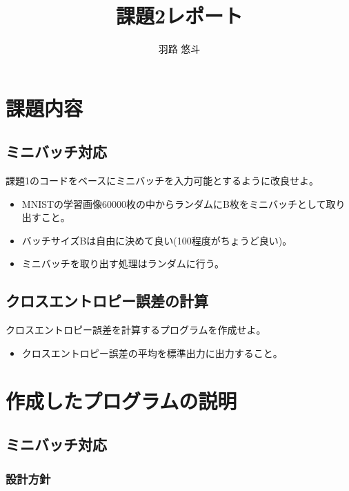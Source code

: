 \documentclass[platex,dvipdfmx]{jsarticle}
\begin{document}
  \title{課題2レポート}
  \author{羽路 悠斗}
  \maketitle

  \section{課題内容}

  \subsection{ミニバッチ対応}

  課題1のコードをベースにミニバッチを入力可能とするように改良せよ。

  \begin{itemize}
    \item MNISTの学習画像60000枚の中からランダムにB枚をミニバッチとして取り出すこと。
    \item バッチサイズBは自由に決めて良い(100程度がちょうど良い)。
    \item ミニバッチを取り出す処理はランダムに行う。
  \end{itemize}

  \subsection{クロスエントロピー誤差の計算}

  クロスエントロピー誤差を計算するプログラムを作成せよ。

  \begin{itemize}
    \item クロスエントロピー誤差の平均を標準出力に出力すること。
  \end{itemize}

  \section{作成したプログラムの説明}

  \subsection{ミニバッチ対応}

  \subsubsection{設計方針}
  
\end{document}
